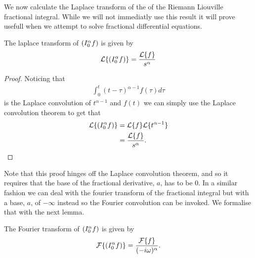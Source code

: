 We now calculate the Laplace transform of the of the Riemann Liouville fractional integral. While we will not immediatly use this result it will prove usefull when we attempt to solve fractional differential equations.
\begin{lemma}
    \label{lem:rli_laplace}
    The laplace transform of $ \left( I_{0}^{\alpha} f \right) $ is given by
    \begin{align}
        \mathcal{L}\{ \left( I_{0}^{\alpha} f \right) \} = \frac{\mathcal{L}\{f\}}{s^\alpha}
    \end{align}
\end{lemma}
\begin{proof}
    Noticing that 
    \begin{align}
        \int_0^t (t - \tau)^{\alpha - 1} f(\tau) d\tau 
    \end{align}
    is the Laplace convolution of $ t^{\alpha - 1} $ and $ f(t) $ we can simply use the Laplace convolution theorem
    to get that
    \begin{align}
        \mathcal{L}\{ \left( I_{0}^{\alpha} f \right) \} &= \mathcal{L}\{f\} \mathcal{L}\{ t^{\alpha - 1} \} \\
            &= \frac{\mathcal{L}\{f\}}{s^\alpha}.
    \end{align}
\end{proof}
Note that this proof hinges off the Laplace convolution theorem, and so it requires that the base of the fractional derivative, $ a $, has to be $ 0 $. In a similar fashion we can deal with the fourier transform of the fractional integral but with a base, $ a $, of $ -\infty $ instead so the Fourier convolution can be invoked. We formalise that with the next lemma.
\begin{lemma}
    \label{lem:rli_fourier}
    The Fourier transform of $ \left( I_{0}^{\alpha} f \right) $ is given by
    \begin{align}
        \mathcal{F}\{ \left( I_{0}^{\alpha} f \right) \} = \frac{\mathcal{F}\{f\}}{(-i\omega)^\alpha}.
    \end{align}
\end{lemma}
